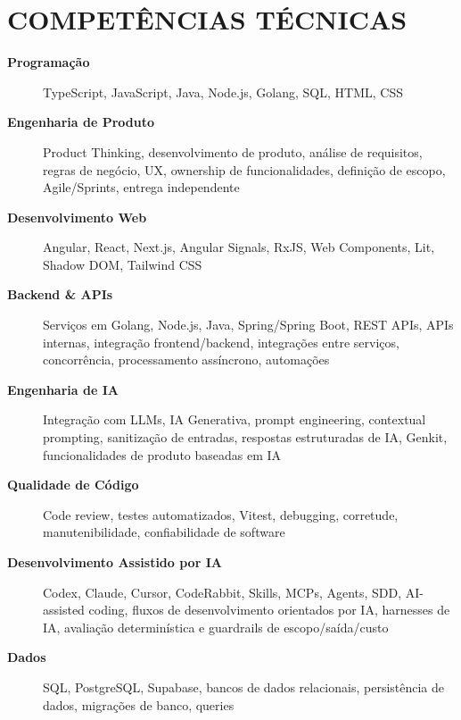 \documentclass[10pt,a4paper]{article}
\begin{document}

\section*{COMPETÊNCIAS TÉCNICAS}

\footnotesize

\begin{description}

    \item[\textbf{Programação}]
    TypeScript, JavaScript, Java, Node.js, Golang, SQL, HTML, CSS

    \item[\textbf{Engenharia de Produto}]
    Product Thinking, desenvolvimento de produto, análise de requisitos,
    regras de negócio, UX, ownership de funcionalidades,
    definição de escopo, Agile/Sprints, entrega independente

    \item[\textbf{Desenvolvimento Web}]
    Angular, React, Next.js, Angular Signals, RxJS,
    Web Components, Lit, Shadow DOM, Tailwind CSS

    \item[\textbf{Backend \& APIs}]
    Serviços em Golang, Node.js, Java, Spring/Spring Boot, REST APIs, APIs internas,
    integração frontend/backend, integrações entre serviços,
    concorrência, processamento assíncrono, automações

    \item[\textbf{Engenharia de IA}]
    Integração com LLMs, IA Generativa, prompt engineering,
    contextual prompting, sanitização de entradas,
    respostas estruturadas de IA, Genkit,
    funcionalidades de produto baseadas em IA

    \item[\textbf{Qualidade de Código}]
    Code review, testes automatizados, Vitest,
    debugging, corretude, manutenibilidade,
    confiabilidade de software

    \item[\textbf{Desenvolvimento Assistido por IA}]
    Codex, Claude, Cursor, CodeRabbit, Skills,
    MCPs, Agents, SDD, AI-assisted coding,
    fluxos de desenvolvimento orientados por IA, harnesses de IA,
    avaliação determinística e guardrails de escopo/saída/custo

    \item[\textbf{Dados}]
    SQL, PostgreSQL, Supabase, bancos de dados relacionais,
    persistência de dados, migrações de banco,
    queries


\end{description}
\end{document}
